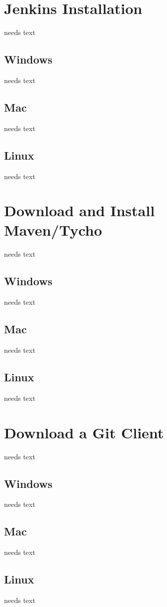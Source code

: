 \documentclass[a4paper,10pt,twoside]{book}
\begin{document}
\section{Jenkins Installation}
needs text

\subsection{Windows}
needs text

\subsection{Mac}
needs text

\subsection{Linux}
needs text

\section{Download and Install Maven/Tycho}
needs text

\subsection{Windows}
needs text

\subsection{Mac}
needs text

\subsection{Linux}
needs text

\section{Download a Git Client}
needs text

\subsection{Windows}
needs text

\subsection{Mac}
needs text

\subsection{Linux}
needs text


\ifx\wholebook\relax\else
   
   
\end{document}
